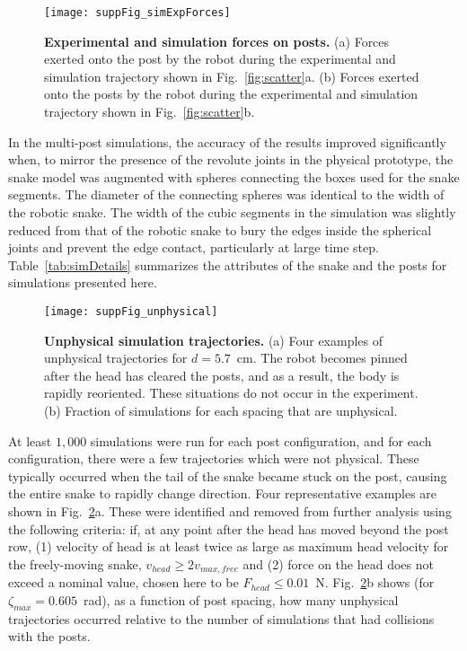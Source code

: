 \documentclass[aps,pre,twocolumn,superscriptaddress]{revtex4-1}
\begin{document}
\begin{figure}[h!]
	\texttt{[image: suppFig\_simExpForces]}
	\caption{\textbf{Experimental and simulation forces on posts.} (a) Forces exerted onto the post by the robot during the experimental and simulation trajectory shown in Fig.~\ref{fig:scatter}a. (b) Forces exerted onto the posts by the robot during the experimental and simulation trajectory shown in Fig.~\ref{fig:scatter}b.}
	\label{fig:forces}
\end{figure}

In the multi-post simulations, the accuracy of the results improved significantly when, to mirror the presence of the revolute joints in the physical prototype, the snake model was augmented with spheres connecting the boxes used for the snake segments. The diameter of the connecting spheres was identical to the width of the robotic snake. The width of the cubic segments in the simulation was slightly reduced from that of the robotic snake to bury the edges inside the spherical joints and prevent the edge contact, particularly at large time step. Table~\ref{tab:simDetails} summarizes the attributes of the snake and the posts for simulations presented here. 

\begin{figure}[h!]
	\texttt{[image: suppFig\_unphysical]}
	\caption{\textbf{Unphysical simulation trajectories.} (a) Four examples of unphysical trajectories for $d = 5.7$~cm.  The robot becomes pinned after the head has cleared the posts, and as a result, the body is rapidly reoriented.  These situations do not occur in the experiment. (b) Fraction of simulations for each spacing that are unphysical.}
	\label{fig:unhealthy}
\end{figure}

At least $1,000$ simulations were run for each post configuration, and for each configuration, there were a few trajectories which were not physical. These typically occurred when the tail of the snake became stuck on the post, causing the entire snake to rapidly change direction. Four representative examples are shown in Fig.~\ref{fig:unhealthy}a. These were identified and removed from further analysis using the following criteria: if, at any point after the head has moved beyond the post row, (1) velocity of head is at least twice as large as maximum head velocity for the freely-moving snake, $v_{head} \ge 2 v_{max,free}$ and (2) force on the head does not exceed a nominal value, chosen here to be $F_{head} \le 0.01$~N. Fig.~\ref{fig:unhealthy}b shows (for $\zeta_{max} = 0.605$~rad), as a function of post spacing, how many unphysical trajectories occurred relative to the number of simulations that had collisions with the posts.
\end{document}
